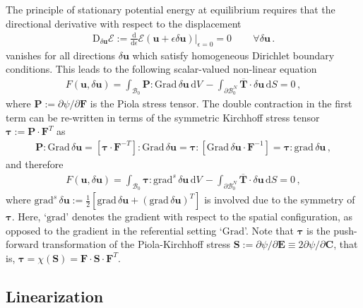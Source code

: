 \documentclass[AMA,STIX1COL]{WileyNJD-v2}
\newcommand*{\gz}[1]{\boldsymbol{#1}}
\newcommand*{\Grad}{\mathrm{Grad}}
\newcommand*{\grad}{\mathrm{grad}}
\renewcommand*{\d}{\mathrm{d}}
\newcommand*{\D}{\mathrm{D}}
\newcommand*{\mcl}[1]{\mathcal{#1}}
\begin{document}
The principle of stationary potential energy at equilibrium requires that the directional derivative with respect to the displacement
\begin{align}
\D_{\displaystyle \delta \gz u} \mcl E :=
\frac{\d}{\d \epsilon} \mcl E (\gz u + \epsilon \delta \gz u) \Bigr\rvert_{\epsilon=0}  = 0 \, \qquad \forall \delta \gz u \, .
\label{eq:stationary}
\end{align}
vanishes for all directions $\delta \gz u$ which satisfy homogeneous Dirichlet boundary conditions.
%
This leads to the following scalar-valued non-linear equation
\begin{align}
F(\gz u, \delta \gz u) =
\int_{\mcl B_0} \gz P : \Grad \, \delta \gz u \, \d V \,
-
\int_{\partial \mcl B_0^N} \overline{\gz T} \cdot \delta \gz u \, \d S
= 0 \, ,
\end{align}
where $\gz P := \partial \psi / \partial \gz F$ is the Piola stress tensor.
The double contraction in the first term can be re-written in terms of the symmetric Kirchhoff stress tensor $\gz \tau := \gz P \cdot \gz F^T$ as
\begin{align}
\gz P : \Grad \, \delta \gz u =
\left[\gz \tau \cdot \gz F^{-T}\right] : \Grad \, \delta \gz u =
\gz \tau : \left[\Grad \, \delta \gz u \cdot \gz F^{-1}\right] =
\gz \tau : \grad \, \delta \gz u \, ,
\end{align}
and therefore
\begin{align}
  F(\gz u, \delta \gz u) =
  \int_{\mcl B_0} \gz \tau : \grad^{s} \, \delta \gz u \, \d V \,
  -
  \int_{\partial \mcl B_0^N} \overline{\gz T} \cdot \delta \gz u \, \d S
  = 0 \, ,
\label{eq:weak_form}
\end{align}
where $\grad^{s} \, \delta \gz u := \frac{1}{2}\left[ \grad \, \delta \gz u + ( \grad \, \delta \gz u)^T\right]$
is involved due to the symmetry of $\gz \tau$. Here, `$\grad$' denotes the gradient with respect to the spatial configuration, as opposed to the gradient in the referential setting `$\Grad$'.
Note that $\gz \tau$ is the push-forward transformation of the Piola-Kirchhoff stress $\gz S := \partial \psi / \partial \gz E \equiv 2 \partial \psi / \partial \gz C$,
that is, $\gz \tau = \chi(\gz S) = \gz F \cdot \gz S \cdot \gz F^T$.

\subsection{Linearization}
\end{document}
